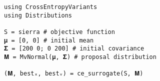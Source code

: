 \begin{lstlisting}[language=JuliaLocal]
using CrossEntropyVariants
using Distributions

S = sierra # objective function
𝛍 = [0, 0] # initial mean
𝚺 = [200 0; 0 200] # initial covariance
𝐌 = MvNormal(𝛍, 𝚺) # proposal distribution

(𝐌, bestₓ, bestᵥ) = ce_surrogate(S, 𝐌)
\end{lstlisting}
